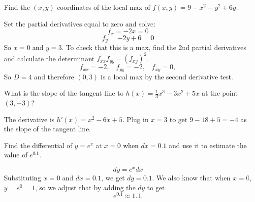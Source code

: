 \documentclass[12pt,answers]{exam}
\begin{document}
\begin{questions}
\begin{parts}
\vfill

\vfill
\end{parts}

\question Find the $(x,y)$ coordinates of the local max of $f(x,y) = 9 - x^2 - y^2 + 6y$. 
\begin{solution}
Set the partial derivatives equal to zero and solve:
$$f_x = -2x = 0$$
$$f_y = -2y + 6 = 0$$
So $x = 0$ and $y = 3$. 
To check that this is a max, find the 2nd partial derivatives and calculate the determinant $f_{xx} f_{yy} - (f_{xy})^2$. 
$$f_{xx} = -2, ~~~~ f_{yy} = -2, ~~~~ f_{xy}  = 0, $$
So $D = 4$ and therefore $(0,3)$ is a local max by the second derivative test.
\end{solution}
\vfill

\newpage


\question What is the slope of the tangent line to $h(x) = \tfrac{1}{3}x^3 - 3x^2 + 5x$ at the point $(3,-3)$?
\begin{solution}
The derivative is $h'(x) = x^2 - 6x + 5$.  Plug in $x=3$ to get $9 - 18 + 5 = -4$ as the slope of the tangent line. 
\end{solution}
\vfill

\question Find the differential of $y = e^{x}$ at $x = 0$ when $dx = 0.1$ and use it to estimate the value of $e^{0.1}$. 
\begin{solution}
$$dy = e^x dx$$
Substituting $x = 0$ and $dx = 0.1$, we get $dy = 0.1$.  We also know that when $x=0$, $y = e^0 = 1$, so we adjust that by adding the $dy$ to get 
$$e^{0.1} \approx 1.1.$$
\end{solution}


\end{questions}
\end{document}
